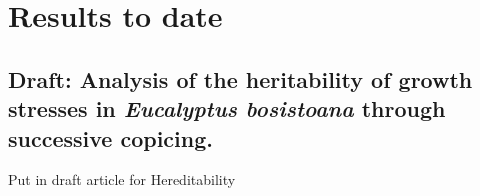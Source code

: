 \section{Results to date}
\subsection{Draft: Analysis of the heritability of growth stresses in \textit{Eucalyptus bosistoana} through successive copicing.}
Put in draft article for Hereditability
  
  